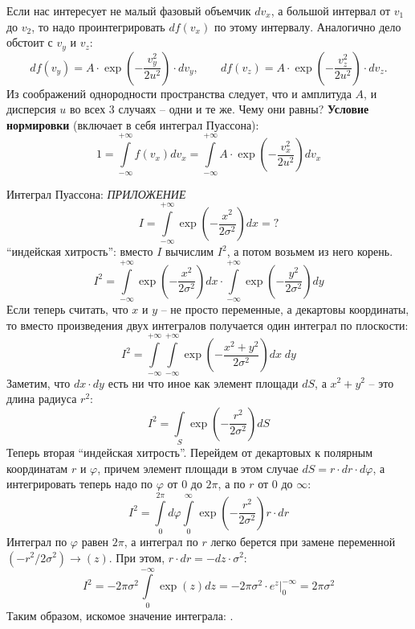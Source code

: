 Если нас интересует не малый фазовый объемчик $dv_x$, а большой интервал от $v_1$ до $v_2$, то надо проинтегрировать $df(v_x)$ по этому интервалу. Анало\-ги\-чно дело обстоит с $v_y$ и $v_z$:
\begin{equation}
df(v_y)=A\cdot \exp\left(-\frac{v_y^2}{2u^2}\right)\cdot dv_y,\;\;\;\;\;\;\;
df(v_z)=A\cdot \exp\left(-\frac{v_z^2}{2u^2}\right)\cdot dv_z.
\end{equation}
Из соображений однородности пространства следует, что и амплитуда $A$, и дисперсия $u$ во всех 3 случаях -- одни и те же. Чему они равны? {\bf Условие нормировки} (включает в себя интеграл Пуассона):
\begin{displaymath}
1=\int\limits_{-\infty}^{+\infty}f(v_x)dv_x=
\int\limits_{-\infty}^{+\infty}A\cdot\exp\left(-\frac{v_x^2}{2u^2}\right)dv_x
\end{displaymath}

Интеграл Пуассона:\hfill{ }{\LARGE\sl ПРИЛОЖЕНИЕ}
\begin{displaymath}
I=\int\limits_{-\infty}^{+\infty}\exp\left(-\frac{x^2}{2\sigma^2}\right)dx=?
\end{displaymath}
``индейская хитрость'': вместо $I$ вычислим $I^2$, а потом возьмем из него корень.
\begin{displaymath}
I^2=\int\limits_{-\infty}^{+\infty}\exp\left(-\frac{x^2}{2\sigma^2}\right)dx\cdot
    \int\limits_{-\infty}^{+\infty}\exp\left(-\frac{y^2}{2\sigma^2}\right)dy
\end{displaymath}
Если теперь считать, что $x$ и $y$ -- не просто переменные, а декартовы координаты, то
вместо произведения двух интегралов получается один интеграл по плоскости:
\begin{displaymath}
I^2=\int\limits_{-\infty}^{+\infty}\int\limits_{-\infty}^{+\infty}\exp\left(-\frac{x^2+y^2}{2\sigma^2}\right)dx\;dy
\end{displaymath}
Заметим, что $dx\cdot dy$ есть ни что иное как элемент площади $dS$, а $x^2+y^2$ -- это длина радиуса $r^2$:
\begin{displaymath}
I^2=\int\limits_S\exp\left(-\frac{r^2}{2\sigma^2}\right)dS
\end{displaymath}
Теперь вторая ``индейская хитрость''. Перейдем от декартовых к полярным координатам $r$ и $\varphi$, причем элемент площади в этом случае $dS=r\cdot dr\cdot d\varphi$, а интегрировать теперь надо по $\varphi$ от 0 до $2\pi$, а по $r$ от 0 до $\infty$:
\begin{displaymath}
I^2=\int\limits_0^{2\pi}d\varphi\int\limits_0^\infty\exp\left(-\frac{r^2}{2\sigma^2}\right)r\cdot dr
\end{displaymath}
Интеграл по $\varphi$ равен $2\pi$, а интеграл по $r$ легко берется при замене переменной $(-r^2/2\sigma^2)\rightarrow (z)$. При этом, $r\cdot dr=-dz\cdot\sigma^2$:
\begin{displaymath}
I^2=-2\pi\sigma^2\int\limits_0^{-\infty}\exp\left(z\right) dz = -2\pi\sigma^2\cdot e^z|_0^{-\infty}=2\pi\sigma^2
\end{displaymath}
Таким образом, искомое значение интеграла: .

